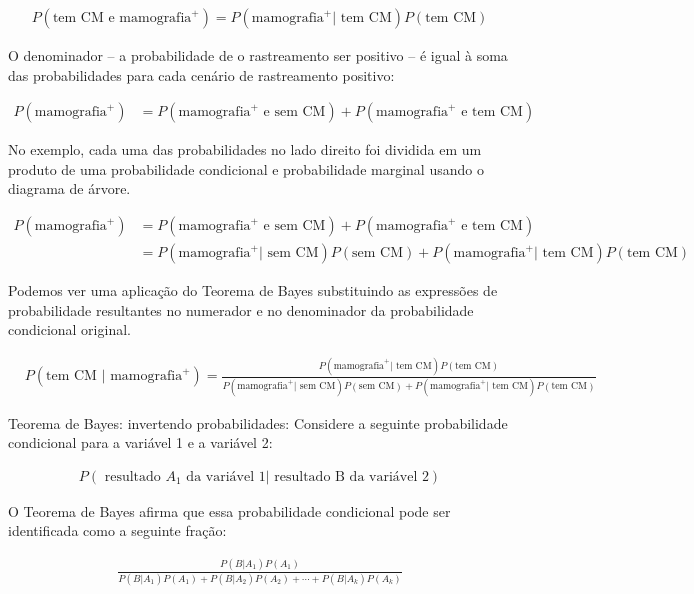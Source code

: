 \documentclass[
]{book}
\theoremstyle{definition}
\theoremstyle{definition}
\theoremstyle{definition}
\theoremstyle{definition}
\theoremstyle{remark}
\begin{document}
\begin{align*}
P(\text{tem CM e mamografia}^+) = P(\text{mamografia}^+ | \text{ tem CM})P(\text{tem CM})
\end{align*}

O denominador -- a probabilidade de o rastreamento ser positivo -- é igual à soma das probabilidades para cada cenário de rastreamento positivo:

\begin{align*}
P(\text{mamografia}^+)
    &= P(\text{mamografia}^+\text{ e sem CM})
        + P(\text{mamografia}^+\text{ e tem CM})
\end{align*}

No exemplo, cada uma das probabilidades no lado direito foi dividida em um produto de uma probabilidade condicional e probabilidade marginal usando o diagrama de árvore.

\begin{align*}
P(\text{mamografia}^+)
&= P(\text{mamografia}^+\text{ e sem CM}) + P(\text{mamografia}^+\text{ e tem CM}) \\
&= P(\text{mamografia}^+ | \text{ sem CM})P(\text{sem CM}) + P(\text{mamografia}^+ | \text{ tem CM})P(\text{tem CM})
\end{align*}

Podemos ver uma aplicação do Teorema de Bayes substituindo as expressões de probabilidade resultantes no numerador e no denominador da probabilidade condicional original.

\begin{align*}
& P(\text{tem CM } | \text{ mamografia}^+)
= \frac{P(\text{mamografia}^+ | \text{ tem CM})P(\text{tem CM})}
    {P(\text{mamografia}^+ | \text{ sem CM})P(\text{sem CM}) + P(\text{mamografia}^+ | \text{ tem CM})P(\text{tem CM})}
\end{align*}

Teorema de Bayes: invertendo probabilidades: Considere a seguinte probabilidade condicional para a variável 1 e a variável 2:

\begin{align*}
P(\text{ resultado }A_1\text{ da variável 1} | \text{ resultado B da variável 2})
\end{align*}

O Teorema de Bayes afirma que essa probabilidade condicional pode ser identificada como a seguinte fração:

\begin{align}
\frac{P(B | A_1) P(A_1)}
    {P(B | A_1) P(A_1) + P(B | A_2) P(A_2) + \cdots + P(B | A_k) P(A_k)}
    \label{eq:equationOfBayesTheorem}
\end{align}
\end{document}
